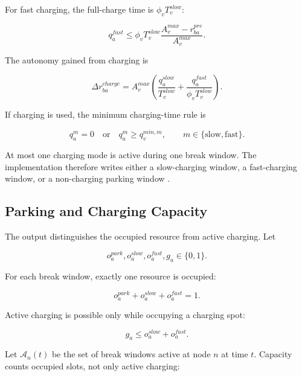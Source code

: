 For fast charging, the full-charge time is \(\phi_vT_v^{slow}\):

\begin{equation}
q_a^{fast}
\le
\phi_vT_v^{slow}
\frac{A_v^{max}-r_{ba}^{pre}}{A_v^{max}}.
\label{eq:charge-upper-fast}
\end{equation}

The autonomy gained from charging is

\begin{equation}
\Delta r_{ba}^{charge}
=
A_v^{max}
\left(
\frac{q_a^{slow}}{T_v^{slow}}
+
\frac{q_a^{fast}}{\phi_vT_v^{slow}}
\right).
\label{eq:charge-gain}
\end{equation}

If charging is used, the minimum charging-time rule is

\begin{equation}
q_a^m=0
\quad\text{or}\quad
q_a^m\ge q_v^{min,m},
\qquad
m\in\{\mathrm{slow},\mathrm{fast}\}.
\label{eq:model-min-charge}
\end{equation}

At most one charging mode is active during one break window. The implementation
therefore writes either a slow-charging window, a fast-charging window, or a
non-charging parking window \cite{minoa-io}.

\subsection{Parking and Charging Capacity}

The output distinguishes the occupied resource from active charging. Let

\begin{equation}
o_a^{park},o_a^{slow},o_a^{fast},g_a\in\{0,1\}.
\label{eq:spot-occupation-vars}
\end{equation}

For each break window, exactly one resource is occupied:

\begin{equation}
o_a^{park}+o_a^{slow}+o_a^{fast}=1.
\label{eq:one-spot-occupied}
\end{equation}

Active charging is possible only while occupying a charging spot:

\begin{equation}
g_a\le o_a^{slow}+o_a^{fast}.
\label{eq:active-charging-spot}
\end{equation}

Let \(\mathcal{A}_n(t)\) be the set of break windows active at node \(n\) at
time \(t\). Capacity counts occupied slots, not only active charging:

